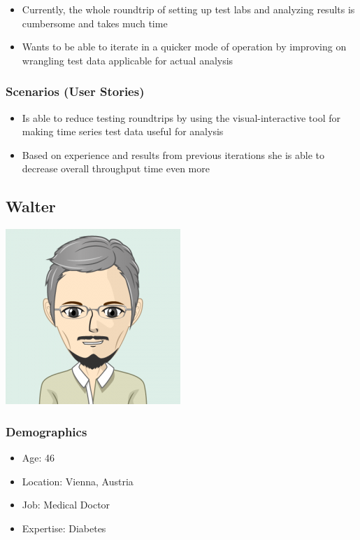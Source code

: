 \begin{itemize}
    \item Currently, the whole roundtrip of setting up test labs and analyzing results is cumbersome and takes much time
    \item Wants to be able to iterate in a quicker mode of operation by improving on wrangling test data applicable for actual analysis
\end{itemize}

\subsubsection{Scenarios (User Stories)}

\begin{itemize}
    \item Is able to reduce testing roundtrips by using the visual-interactive tool for making time series test data useful for analysis
    \item Based on experience and results from previous iterations she is able to decrease overall throughput time even more
\end{itemize}


\subsection{Walter}

\includegraphics[scale=0.5]{figures/requirements/persona-avatar-walter}

\subsubsection{Demographics}

\begin{itemize}
    \item Age: 46
    \item Location: Vienna, Austria
    \item Job: Medical Doctor
    \item Expertise: Diabetes
\end{itemize}


